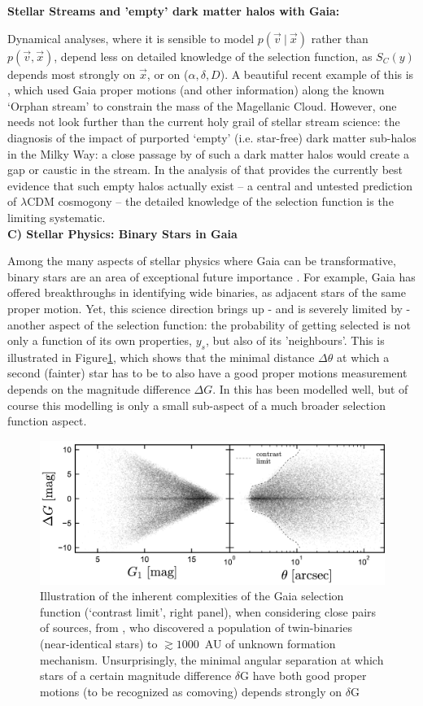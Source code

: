 \noindent\textbf{Stellar Streams and 'empty' dark matter halos with Gaia:\ }

Dynamical analyses, where it is sensible to model $p(\vec{v}~|~\vec{x})$ rather than $p(\vec{v},\vec{x})$, depend less on detailed knowledge of the selection function, as $S_C(y)$ depends most strongly on $\vec{x}$, or on ($\alpha,\delta,D$). A beautiful recent example of this is \citet{Erkal2019}, which used Gaia proper motions (and other information) along the known `Orphan stream' to constrain the mass of the Magellanic Cloud. 
However, one needs not look further than the current holy grail of stellar stream science: the diagnosis of the impact of purported `empty' (i.e. star-free) dark matter sub-halos in the Milky Way: a close passage by of such a dark matter halos would create a gap or caustic in the stream. In the analysis of \citet{Bonaca2019} that provides the currently best evidence that such empty halos actually exist -- a central and untested prediction of $\lambda$CDM cosmogony -- the detailed knowledge of the selection function is the limiting systematic. 
\\

\noindent\textbf{C) Stellar Physics: Binary Stars in Gaia}

Among the many aspects of stellar physics where Gaia can be transformative, binary stars are an area of exceptional future importance \citep[e.g.][]{Breivik2019}. For example, Gaia has offered breakthroughs in identifying wide binaries, as adjacent stars of the same proper motion. Yet, this science direction brings up - and is severely limited by - another aspect of the selection function: the probability of getting selected is not only a function of its own properties, $y_s$, but also of its 'neighbours'. This is illustrated in Figure\ref{fig:binaries}, which shows that the minimal distance $\Delta\theta$ at which a second (fainter) star has to be to also have a good proper motions measurement depends on the magnitude difference $\Delta G$. In \citet{ElBadry2019} this has been modelled well, but of course this modelling is only a small sub-aspect of a much broader selection function aspect.

\begin{figure}[ht!]
    \centering
    \includegraphics[width=0.5\linewidth]{img/BinarySelection_ElBadry.png}
    \caption{Illustration of the inherent complexities of the Gaia selection function (`contrast limit', right panel), when considering close pairs of sources, from \citet{ElBadry2019}, who discovered a population of twin-binaries (near-identical stars) to $\gtrsim 1000$~AU of unknown formation mechanism.
    Unsurprisingly, the minimal angular separation at which stars of a certain magnitude difference $\delta$G have both good proper motions (to be recognized as comoving) depends strongly on $\delta$G}
    \label{fig:binaries}
\end{figure}

